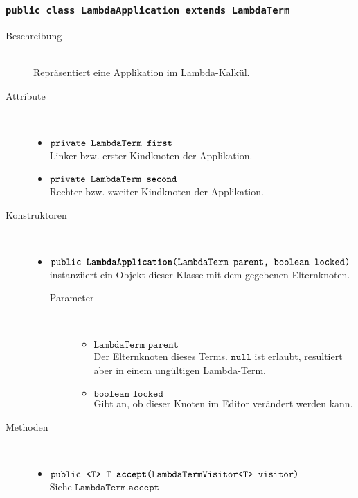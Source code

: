 \subsubsection{\normalfont \texttt{public class \textbf{LambdaApplication} extends LambdaTerm}}

\begin{description}
\item[Beschreibung] \hfill \\ Repräsentiert eine Applikation im Lambda-Kalkül.
\item[Attribute] \hfill \\
	\vspace{-.8cm}
	\begin{itemize}
		\item $\texttt{private LambdaTerm \textbf{first}}$ \\ Linker bzw. erster Kindknoten der Applikation.
		\item $\texttt{private LambdaTerm \textbf{second}}$ \\ Rechter bzw. zweiter Kindknoten der Applikation.
	\end{itemize}
	
\item[Konstruktoren] \hfill \\
	\vspace{-.8cm}
	\begin{itemize}
		\item $\texttt{public \textbf{LambdaApplication}(LambdaTerm parent, boolean locked)}$ \\ instanziiert ein Objekt dieser Klasse mit dem gegebenen Elternknoten.
		\begin{description}
			\item[Parameter] \hfill \\
			\vspace{-.8cm}
			\begin{itemize}
				\item $\texttt{LambdaTerm parent}$ \\ Der Elternknoten dieses Terms. $\texttt{null}$ ist erlaubt, resultiert aber in einem ungültigen Lambda-Term.
				\item $\texttt{boolean locked}$ \\ Gibt an, ob dieser Knoten im Editor verändert werden kann.
			\end{itemize}
		\end{description}
	\end{itemize}
	
\item[Methoden] \hfill \\
	\vspace{-.8cm}
	\begin{itemize}
		\item $\texttt{public <T> T \textbf{accept}(LambdaTermVisitor<T> visitor)}$ \\ Siehe $\texttt{LambdaTerm.accept}$
		

\end{itemize}
\end{description}
